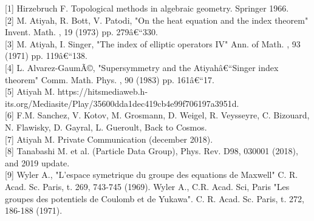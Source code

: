 \documentclass[a4paper,9pt]{article}
\begin{document}
{\begin{table*}
\begin{tabular}{llll}
    
     
      
     
   \bottomrule
  \end{tabular}
  \label{tab:table}
\end{table*}


  



\begin{thebibliography}{1}

[1]  Hirzebruch F. Topological methods in algebraic geometry. Springer 1966.\\

[2]  M. Atiyah, R. Bott, V. Patodi, "On the heat equation and the index theorem" Invent. Math. , 19 (1973) pp. 279â€“330.\\

[3]  M. Atiyah, I. Singer, "The index of elliptic operators IV" Ann. of Math. , 93 (1971) pp. 119â€“138. \\

[4]  L. Alvarez-GaumÃ©, "Supersymmetry and the Atiyahâ€“Singer index theorem" Comm. Math. Phys. , 90 (1983) pp. 161â€“17.\\

[5] Atiyah M. https://hitsmediaweb.h-its.org/Mediasite/Play/35600dda1dec419cb4e99f706197a3951d. \\ 


[6] F.M. Sanchez, V. Kotov, M. Grosmann, D. Weigel, R. Veysseyre, C. Bizouard, N. Flawisky, D. Gayral, L. Gueroult, Back to Cosmos.\\

[7]  Atiyah M. Private Communication (december 2018).\\

[8] Tanabashi M. et al. (Particle Data Group), Phys. Rev. D98, 030001 (2018), and 2019 update.\\

[9]  Wyler A., "L'espace symetrique du groupe des equations de Maxwell" C. R. Acad. Sc. Paris, t. 269, 743-745 (1969). Wyler A., C.R. Acad. Sci, Paris "Les groupes des potentiels de Coulomb et de Yukawa". C. R. Acad. Sc. Paris, t. 272, 186-188 (1971).\\


\end{thebibliography}}
\end{document}

